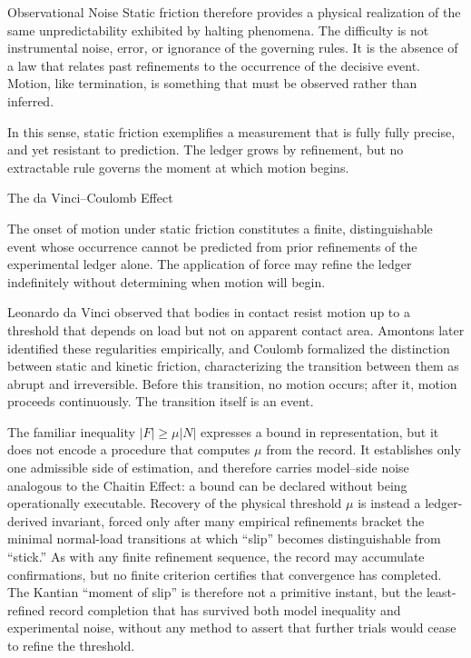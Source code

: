 \begin{coda}{Observational Noise}
Static friction therefore provides a physical realization of the same
unpredictability exhibited by halting phenomena. The difficulty is not instrumental noise,
error, or ignorance of the governing rules. It is the absence of a law that
relates past refinements to the occurrence of the decisive event. Motion, like
termination, is something that must be observed rather than inferred.

In this sense, static friction exemplifies a measurement that is fully
fully precise, and yet resistant to prediction. The ledger grows
by refinement, but no extractable rule governs the moment at which motion
begins.

\begin{phenom}{The da Vinci--Coulomb Effect~\cite{davinci1493,coulomb1785}}
\label{ph:static-friction}

\PhStatement
The onset of motion under static friction constitutes a finite, distinguishable
event whose occurrence cannot be predicted from prior refinements of the
experimental ledger alone. The application of force may refine the ledger indefinitely
without determining when motion will begin.

\PhOrigin
Leonardo da Vinci observed that bodies in contact resist motion up to a
threshold that depends on load but not on apparent contact area. Amontons later
identified these regularities empirically, and Coulomb formalized the
distinction between static and kinetic friction, characterizing the transition
between them as abrupt and irreversible. Before this transition, no motion
occurs; after it, motion proceeds continuously. The transition itself is an
event.

\PhObservation
The familiar inequality $|F| \ge \mu |N|$ expresses a bound in representation,
but it does not encode a procedure that computes $\mu$ from the record. It
establishes only one admissible side of estimation, and therefore carries
model--side noise analogous to the Chaitin Effect: a bound can be declared
without being operationally executable. Recovery of the physical threshold
$\mu$ is instead a ledger-derived invariant, forced only after many empirical
refinements bracket the minimal normal-load transitions at which ``slip''
becomes distinguishable from ``stick.'' As with any finite refinement
sequence, the record may accumulate confirmations, but no finite criterion
certifies that convergence has completed. The Kantian ``moment of slip'' is
therefore not a primitive instant, but the least-refined record completion
that has survived both model inequality and experimental noise, without any
method to assert that further trials would cease to refine the threshold.


\end{phenom}
\end{coda}

